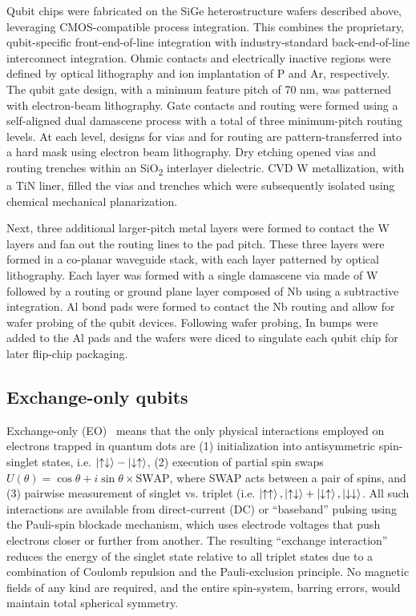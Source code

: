 \documentclass[aps,prl,twocolumn,superscriptaddress,nobibnotes,10pt,floatfix]{revtex4-2}
\begin{document}
	Qubit chips were fabricated on the SiGe heterostructure wafers described above, leveraging CMOS-compatible process integration.
	This combines the proprietary, qubit-specific front-end-of-line integration with industry-standard back-end-of-line interconnect integration.
	Ohmic contacts and electrically inactive regions were defined by optical lithography and ion implantation of P and Ar, respectively.
	The qubit gate design, with a minimum feature pitch of 70 nm, was patterned with electron-beam lithography.
	Gate contacts and routing were formed using a self-aligned dual damascene process with a total of three minimum-pitch routing levels.
	At each level, designs for vias and for routing are pattern-transferred into a hard mask using electron beam lithography.
	Dry etching opened vias and routing trenches within an SiO\textsubscript{2} interlayer dielectric.
	CVD W metallization, with a TiN liner, filled the vias and trenches which were subsequently isolated using chemical mechanical planarization.

	Next, three additional larger-pitch metal layers were formed to contact the W layers and fan out the routing lines to the pad pitch.
	These three layers were formed in a co-planar waveguide stack, with each layer patterned by optical lithography.
	Each layer was formed with a single damascene via made of W followed by a routing or ground plane layer composed of Nb using a subtractive integration.
	Al bond pads were formed to contact the Nb routing and allow for wafer probing of the qubit devices.
	Following wafer probing, In bumps were added to the Al pads and the wafers were diced to singulate each qubit chip for later flip-chip packaging.

	\subsection{Exchange-only qubits}\label{exchange-only-qubits}

	Exchange-only (EO)~\cite{
		bacon_universal_2000,
		divincenzo_universal_2000,
		fong_universal_2011,
		langrock_reset-if-leaked_2020,
		madzik_operating_2025,
		ha_flexible_2022,
		weinstein_universal_2023,
		ha_two-dimensional_2025,
		andrews_quantifying_2019,
		sun_full-permutation_2024}
	means that the only physical interactions employed on electrons trapped in quantum dots are
	(1) initialization into antisymmetric spin-singlet states, i.e. $\ket{\uparrow\downarrow}-\ket{\downarrow\uparrow}$,
	(2) execution of partial spin swaps $U(\theta) = \cos\theta + i \sin\theta\times\text{SWAP}$, where SWAP acts between a pair of spins, and
	(3) pairwise measurement of singlet vs. triplet (i.e. $\ket{\uparrow\uparrow}, \ket{\uparrow\downarrow}+\ket{\downarrow\uparrow}, \ket{\downarrow\downarrow}$.
	All such interactions are available from direct-current (DC) or ``baseband'' pulsing using the Pauli-spin blockade mechanism, which uses electrode voltages that push electrons closer or further from another.
	The resulting ``exchange interaction'' reduces the energy of the singlet state relative to all triplet states due to a combination of Coulomb repulsion and the Pauli-exclusion principle.
	No magnetic fields of any kind are required, and the entire spin-system, barring errors, would maintain total spherical symmetry.
\end{document}
